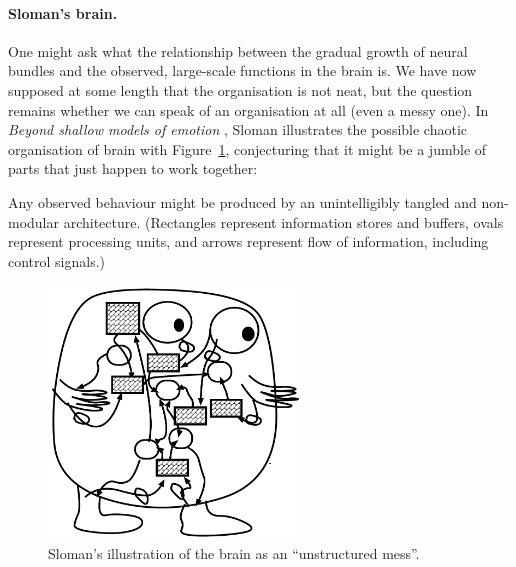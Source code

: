 \paragraph{Sloman's brain.} One might ask what the relationship between the gradual growth of neural bundles and the observed, large-scale functions in the brain is. We have now supposed at some length that the organisation is not neat, but the question remains whether we can speak of an organisation at all (even a messy one). In {\em Beyond shallow models of emotion} \cite[p. 8]{sloman2000}, Sloman illustrates the possible chaotic organisation of brain with Figure~\ref{fig:slomanBrain}, conjecturing that it might be a jumble of parts that just happen to work together:

\begin{emquote}
	Any observed behaviour might be produced by an unintelligibly tangled and non-modular architecture. (Rectangles represent information stores and buffers, ovals represent processing
	units, and arrows represent flow of information, including control signals.)
\end{emquote}

\begin{figure}
	\centering
	\includegraphics[width=0.6\textwidth]{Figs/slomanBrain.png}
	\caption{Sloman's illustration of the brain as an ``unstructured mess''.}
	\label{fig:slomanBrain}
\end{figure}

